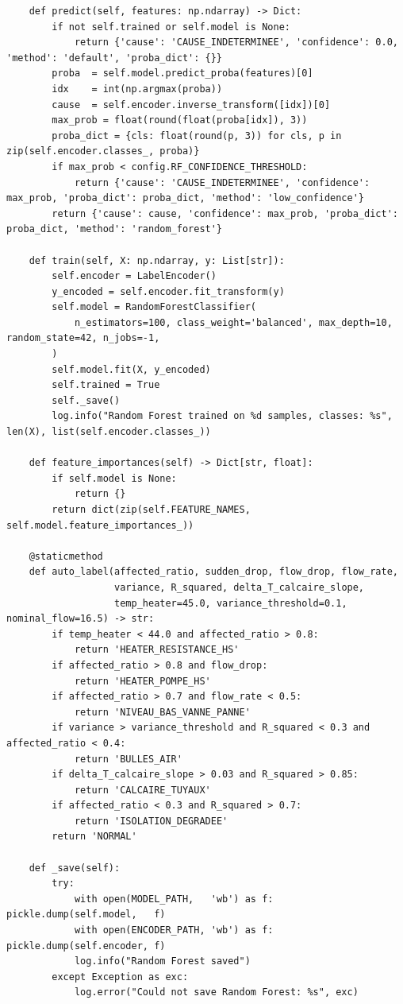 \begin{lstlisting}
    def predict(self, features: np.ndarray) -> Dict:
        if not self.trained or self.model is None:
            return {'cause': 'CAUSE_INDETERMINEE', 'confidence': 0.0, 'method': 'default', 'proba_dict': {}}
        proba  = self.model.predict_proba(features)[0]
        idx    = int(np.argmax(proba))
        cause  = self.encoder.inverse_transform([idx])[0]
        max_prob = float(round(float(proba[idx]), 3))
        proba_dict = {cls: float(round(p, 3)) for cls, p in zip(self.encoder.classes_, proba)}
        if max_prob < config.RF_CONFIDENCE_THRESHOLD:
            return {'cause': 'CAUSE_INDETERMINEE', 'confidence': max_prob, 'proba_dict': proba_dict, 'method': 'low_confidence'}
        return {'cause': cause, 'confidence': max_prob, 'proba_dict': proba_dict, 'method': 'random_forest'}

    def train(self, X: np.ndarray, y: List[str]):
        self.encoder = LabelEncoder()
        y_encoded = self.encoder.fit_transform(y)
        self.model = RandomForestClassifier(
            n_estimators=100, class_weight='balanced', max_depth=10, random_state=42, n_jobs=-1,
        )
        self.model.fit(X, y_encoded)
        self.trained = True
        self._save()
        log.info("Random Forest trained on %d samples, classes: %s", len(X), list(self.encoder.classes_))

    def feature_importances(self) -> Dict[str, float]:
        if self.model is None:
            return {}
        return dict(zip(self.FEATURE_NAMES, self.model.feature_importances_))

    @staticmethod
    def auto_label(affected_ratio, sudden_drop, flow_drop, flow_rate,
                   variance, R_squared, delta_T_calcaire_slope,
                   temp_heater=45.0, variance_threshold=0.1, nominal_flow=16.5) -> str:
        if temp_heater < 44.0 and affected_ratio > 0.8:
            return 'HEATER_RESISTANCE_HS'
        if affected_ratio > 0.8 and flow_drop:
            return 'HEATER_POMPE_HS'
        if affected_ratio > 0.7 and flow_rate < 0.5:
            return 'NIVEAU_BAS_VANNE_PANNE'
        if variance > variance_threshold and R_squared < 0.3 and affected_ratio < 0.4:
            return 'BULLES_AIR'
        if delta_T_calcaire_slope > 0.03 and R_squared > 0.85:
            return 'CALCAIRE_TUYAUX'
        if affected_ratio < 0.3 and R_squared > 0.7:
            return 'ISOLATION_DEGRADEE'
        return 'NORMAL'

    def _save(self):
        try:
            with open(MODEL_PATH,   'wb') as f: pickle.dump(self.model,   f)
            with open(ENCODER_PATH, 'wb') as f: pickle.dump(self.encoder, f)
            log.info("Random Forest saved")
        except Exception as exc:
            log.error("Could not save Random Forest: %s", exc)


\end{lstlisting}
